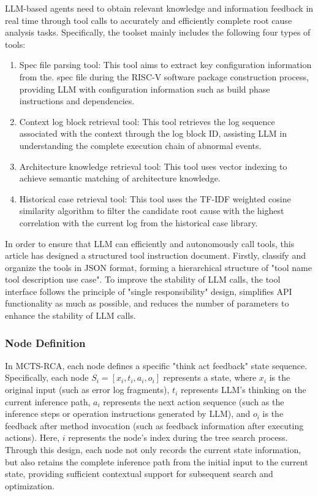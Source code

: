 \documentclass[10pt,conference]{IEEEtran}
\begin{document}
LLM-based agents need to obtain relevant knowledge and information feedback in real time through tool calls to accurately and efficiently complete root cause analysis tasks. Specifically, the toolset mainly includes the following four types of tools:
\begin{enumerate}
\item Spec file parsing tool: This tool aims to extract key configuration information from the. spec file during the RISC-V software package construction process, providing LLM with configuration information such as build phase instructions and dependencies.
    
\item Context log block retrieval tool: This tool retrieves the log sequence associated with the context through the log block ID, assisting LLM in understanding the complete execution chain of abnormal events.
    
\item Architecture knowledge retrieval tool: This tool uses vector indexing to achieve semantic matching of architecture knowledge.

\item Historical case retrieval tool: This tool uses the TF-IDF weighted cosine similarity algorithm to filter the candidate root cause with the highest correlation with the current log from the historical case library.
\end{enumerate}

In order to ensure that LLM can efficiently and autonomously call tools, this article has designed a structured tool instruction document. Firstly, classify and organize the tools in JSON format, forming a hierarchical structure of "tool name tool description use case". To improve the stability of LLM calls, the tool interface follows the principle of "single responsibility" design, simplifies API functionality as much as possible, and reduces the number of parameters to enhance the stability of LLM calls.

\subsubsection{Node Definition}\label{ss:mcts-node}
In MCTS-RCA, each node defines a specific "think act feedback" state sequence. Specifically, each node $S_i = [x_i, t_i, a_i, o_i]$ represents a state, where $x_i$ is the original input (such as error log fragments), $t_i$ represents LLM's thinking on the current inference path, $a_i$ represents the next action sequence (such as the inference steps or operation instructions generated by LLM), and $o_i$ is the feedback after method invocation (such as feedback information after executing actions). Here, $i$ represents the node's index during the tree search process. Through this design, each node not only records the current state information, but also retains the complete inference path from the initial input to the current state, providing sufficient contextual support for subsequent search and optimization.
\end{document}
